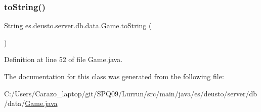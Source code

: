 \subsubsection{\texorpdfstring{to\+String()}{toString()}}
{\footnotesize\ttfamily String es.\+deusto.\+server.\+db.\+data.\+Game.\+to\+String (\begin{DoxyParamCaption}{ }\end{DoxyParamCaption})}



Definition at line 52 of file Game.\+java.



The documentation for this class was generated from the following file\+:\begin{DoxyCompactItemize}
\item 
C\+:/\+Users/\+Carazo\+\_\+laptop/git/\+S\+P\+Q09/\+Lurrun/src/main/java/es/deusto/server/db/data/\hyperlink{_game_8java}{Game.\+java}\end{DoxyCompactItemize}
